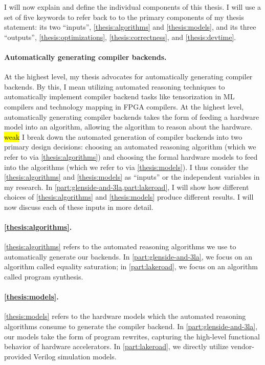 \vspace{10mm}

I will now explain and define
  the individual components
  of this thesis.
I will use a set of five keywords
  to refer back to 
  to the primary components of my
  thesis statement:
  its two ``inputs'',
  \cref{thesis:algorithms} and
  \cref{thesis:models},
  and its three ``outputs'',
  \cref{thesis:optimizations},
  \cref{thesis:correctness}, and
  \cref{thesis:devtime}.

\paragraph{Automatically generating compiler 
  backends.}
At the highest level,
  my thesis advocates for
  automatically generating compiler backends.
By this, I mean
  utilizing automated reasoning techniques
  to automatically implement
  compiler backend tasks like
  tensorization in ML compilers
  and technology mapping in FPGA compilers.
At the highest level,
  automatically generating compiler backends
  takes the form of
  feeding
  a hardware model
  into an algorithm,
  allowing the algorithm
  to reason about the hardware.
\hl{weak}
I break down the automated generation
  of compiler backends
  into two primary design decisions:
  choosing an automated reasoning algorithm
  (which we refer to via
    \cref{thesis:algorithms})
  and choosing the formal hardware models
  to feed into the algorithms
  (which we refer to via
    \cref{thesis:models}).
I thus consider   
  the
  \cref{thesis:algorithms}
  and
  \cref{thesis:models}
  as ``inputs''
  or the independent variables
  in my research.
In \cref{part:glenside-and-3la,part:lakeroad},
  I will show how
  different choices of 
  \cref{thesis:algorithms}
  and
  \cref{thesis:models}
  produce different results.
I will now discuss
  each of these inputs
  in more detail.

\paragraph{\cref{thesis:algorithms}.}
\cref{thesis:algorithms}
  refers
  to the automated reasoning algorithms
  we use
  to automatically generate our backends.
In
  \cref{part:glenside-and-3la},
  we focus on an algorithm called
  equality saturation;
  in
  \cref{part:lakeroad},
  we focus on an algorithm called
  program synthesis.

\paragraph{\cref{thesis:models}.}
\cref{thesis:models}
  refers to the hardware models
  which the automated reasoning algorithms
  consume
  to generate the compiler backend.
In \cref{part:glenside-and-3la},
  our models take the form
  of program rewrites,
  capturing the high-level 
  functional behavior
  of hardware accelerators.
In \cref{part:lakeroad},
  we directly utilize
  vendor-provided
  Verilog simulation models.


